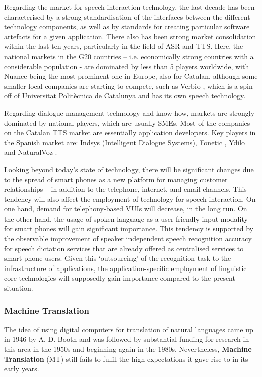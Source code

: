 \begin{multicols}{2}
Regarding the market for speech interaction technology, the last decade has been characterised by a strong standardisation of the interfaces between the different technology components, as well as by standards for creating particular software artefacts for a given application. There also has been strong market consolidation within the last ten years, particularly in the field of ASR and TTS. Here, the national markets in the G20 countries – i.e. economically strong countries with a considerable population - are dominated by less than 5 players worldwide, with Nuance being the most prominent one in Europe, also for Catalan, although some smaller local companies are starting to compete, such as Verbio \cite{CAT-Nota25}, which is a spin-off of Universitat Politècnica de Catalunya and has its own speech technology. 

Regarding dialogue management technology and know-how, markets are strongly dominated by national players, which are usually SMEs. Most of the companies on the Catalan TTS market are essentially application developers. Key players in the Spanish market are: Indsys \cite{CAT-Nota26} (Intelligent Dialogue Systems), Fonetic \cite{CAT-Nota27}, Ydilo \cite{CAT-Nota28} and NaturalVoz \cite{CAT-Nota29}.

Looking beyond today’s state of technology, there will be significant changes due to the spread of smart phones as a new platform for managing customer relationships – in addition to the telephone, internet, and email channels. This tendency will also affect the employment of technology for speech interaction. On one hand, demand for telephony-based VUIs will decrease, in the long run. On the other hand, the usage of spoken language as a user-friendly input modality for smart phones will gain significant importance. This tendency is supported by the observable improvement of speaker independent speech recognition accuracy for speech dictation services that are already offered as centralised services to smart phone users. Given this ‘outsourcing’ of the recognition task to the infrastructure of applications, the application-specific employment of linguistic core technologies will supposedly gain importance compared to the present situation. 

\subsubsection{Machine Translation}

The idea of using digital computers for translation of natural languages came up in 1946 by A. D. Booth and was followed by substantial funding for research in this area in the 1950s and beginning again in the 1980s. Nevertheless, \textbf{Machine Translation} (MT) still fails to fulfil the high expectations it gave rise to in its early years. 


\end{multicols}
